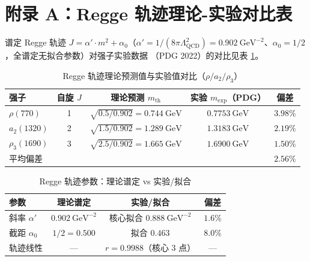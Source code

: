 
\section*{附录 A：Regge 轨迹理论-实验对比表}
\label{app:regge-table}

谱定 Regge 轨迹 $J = \alpha'\cdot m^2 + \alpha_0$（$\alpha' = 1/(8\pi\Lambda_{\mathrm{QCD}}^2)
= 0.902\ \mathrm{GeV}^{-2}$、$\alpha_0 = 1/2$，全谱定无拟合参数）对强子实验数据
（PDG 2022）的对比见表 \ref{tab:regge-appendix}。

\begin{table}[htbp]
\centering
\caption{Regge 轨迹理论预测值与实验值对比（$\rho/a_2/\rho_3$）}
\label{tab:regge-appendix}
\begin{tabular}{lcccc}
\hline
强子 & 自旋 $J$ & 理论预测 $m_{\mathrm{th}}$ & 实验 $m_{\mathrm{exp}}$（PDG） & 偏差 \\
\hline
$\rho(770)$   & 1 & $\sqrt{0.5/0.902} = 0.744\ \mathrm{GeV}$ & $0.7753\ \mathrm{GeV}$ & $3.98\%$ \\
$a_2(1320)$   & 2 & $\sqrt{1.5/0.902} = 1.289\ \mathrm{GeV}$ & $1.3183\ \mathrm{GeV}$ & $2.19\%$ \\
$\rho_3(1690)$& 3 & $\sqrt{2.5/0.902} = 1.665\ \mathrm{GeV}$ & $1.6900\ \mathrm{GeV}$ & $1.50\%$ \\
\hline
平均偏差 & & & & $\mathbf{2.56\%}$ \\
\hline
\end{tabular}
\end{table}

\begin{table}[htbp]
\centering
\caption{Regge 轨迹参数：理论谱定 vs 实验/拟合}
\label{tab:regge-params}
\begin{tabular}{lccc}
\hline
参数 & 理论谱定 & 实验/拟合 & 偏差 \\
\hline
斜率 $\alpha'$ & $0.902\ \mathrm{GeV}^{-2}$ & 核心拟合 $0.888\ \mathrm{GeV}^{-2}$ & $1.6\%$ \\
截距 $\alpha_0$ & $1/2 = 0.500$ & 拟合 $0.463$ & $8.0\%$ \\
轨迹线性 & --- & $r = 0.9988$（核心 3 点） & --- \\
\hline
\end{tabular}
\end{table}

